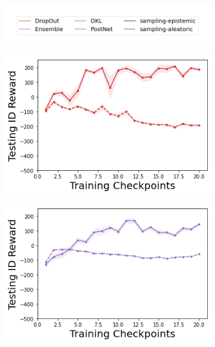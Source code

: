 \begin{figure}
    \centering
        \vspace{-6mm}
    \begin{subfigure}{.45\textwidth}
        \includegraphics[width=\textwidth]{sections/011_icml2022/resources/sampling-legend.png}
    \end{subfigure}
    \vspace{-5mm}
    
    \begin{subfigure}{.2\textwidth}
        \includegraphics[width=\textwidth]{sections/011_icml2022/resources/DropOut-LunarLander-v2-mean_reward_-testing-strategy.png}
    \end{subfigure}
    \begin{subfigure}{.2\textwidth}
        \includegraphics[width=\textwidth]{sections/011_icml2022/resources/Ensemble-LunarLander-v2-mean_reward_-testing-strategy.png}

\end{subfigure}
\end{figure}
